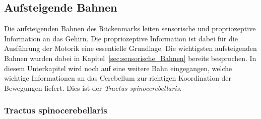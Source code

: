 \documentclass[12pt,a4paper,pdftex]{article}
\begin{document}
\subsection{Aufsteigende Bahnen}
Die aufsteigenden Bahnen des Rückenmarks leiten sensorische und propriozeptive Information an das Gehirn. Die propriozeptive Information ist dabei für die Ausführung der Motorik eine essentielle Grundlage. Die wichtigsten aufsteigenden Bahnen wurden dabei in Kapitel~\ref{sec:sensorische_Bahnen} bereits besprochen. In diesem Unterkapitel wird noch auf eine weitere Bahn eingegangen, welche wichtige Informationen an das Cerebellum zur richtigen Koordination der Bewegungen liefert. Dies ist der \textit{Tractus spinocerebellaris}. 

\subsubsection{Tractus spinocerebellaris}  \label{subsub:spinocerebellaris}
\end{document}
